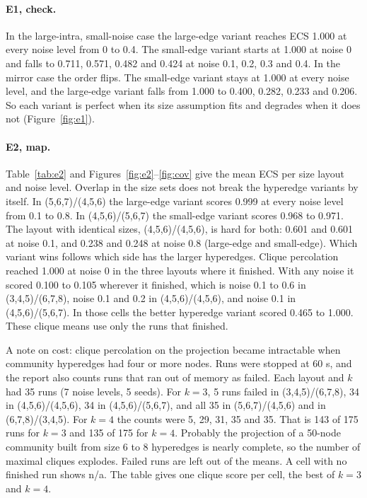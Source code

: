 \documentclass[11pt,a4paper]{article}
\begin{document}
\paragraph{E1, check.} In the large-intra, small-noise case the large-edge variant reaches ECS 1.000 at every noise level from 0 to 0.4. The small-edge variant starts at 1.000 at noise 0 and falls to 0.711, 0.571, 0.482 and 0.424 at noise 0.1, 0.2, 0.3 and 0.4. In the mirror case the order flips. The small-edge variant stays at 1.000 at every noise level, and the large-edge variant falls from 1.000 to 0.400, 0.282, 0.233 and 0.206. So each variant is perfect when its size assumption fits and degrades when it does not (Figure~\ref{fig:e1}).

\paragraph{E2, map.} Table~\ref{tab:e2} and Figures~\ref{fig:e2}--\ref{fig:cov} give the mean ECS per size layout and noise level. Overlap in the size sets does not break the hyperedge variants by itself. In (5,6,7)/(4,5,6) the large-edge variant scores 0.999 at every noise level from 0.1 to 0.8. In (4,5,6)/(5,6,7) the small-edge variant scores 0.968 to 0.971. The layout with identical sizes, (4,5,6)/(4,5,6), is hard for both: 0.601 and 0.601 at noise 0.1, and 0.238 and 0.248 at noise 0.8 (large-edge and small-edge). Which variant wins follows which side has the larger hyperedges. Clique percolation reached 1.000 at noise 0 in the three layouts where it finished. With any noise it scored 0.100 to 0.105 wherever it finished, which is noise 0.1 to 0.6 in (3,4,5)/(6,7,8), noise 0.1 and 0.2 in (4,5,6)/(4,5,6), and noise 0.1 in (4,5,6)/(5,6,7). In those cells the better hyperedge variant scored 0.465 to 1.000. These clique means use only the runs that finished.

A note on cost: clique percolation on the projection became intractable when community hyperedges had four or more nodes. Runs were stopped at 60 s, and the report also counts runs that ran out of memory as failed. Each layout and $k$ had 35 runs (7 noise levels, 5 seeds). For $k{=}3$, 5 runs failed in (3,4,5)/(6,7,8), 34 in (4,5,6)/(4,5,6), 34 in (4,5,6)/(5,6,7), and all 35 in (5,6,7)/(4,5,6) and in (6,7,8)/(3,4,5). For $k{=}4$ the counts were 5, 29, 31, 35 and 35. That is 143 of 175 runs for $k{=}3$ and 135 of 175 for $k{=}4$. Probably the projection of a 50-node community built from size 6 to 8 hyperedges is nearly complete, so the number of maximal cliques explodes. Failed runs are left out of the means. A cell with no finished run shows n/a. The table gives one clique score per cell, the best of $k{=}3$ and $k{=}4$.
\end{document}
